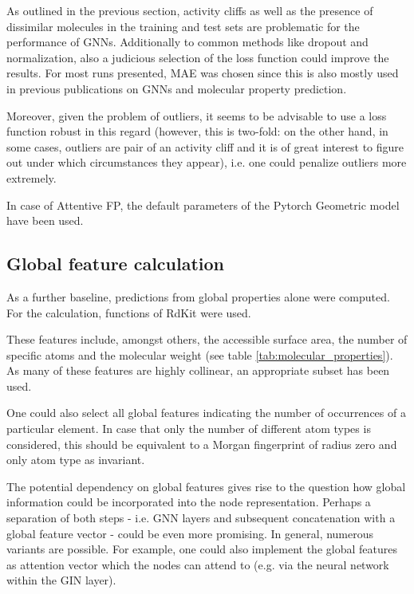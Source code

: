 As outlined in the previous section, activity cliffs as well as the presence of dissimilar molecules in the training and test sets are problematic for the performance of GNNs. Additionally to common methods like dropout and normalization, also a judicious selection of the loss function could improve the results.
For most runs presented, MAE was chosen since this is also mostly used in previous publications on GNNs and molecular property prediction.

Moreover, given the problem of outliers, it seems to be advisable to use a loss function robust in this regard (however, this is two-fold: on the other hand, in some cases, outliers are pair of an activity cliff and it is of great interest to figure out under which circumstances they appear), i.e. one could penalize outliers more extremely.

In case of Attentive FP, the default parameters of the Pytorch Geometric model have been used.




\subsection{Global feature calculation}

As a further baseline, predictions from global properties alone were computed. 
For the calculation, functions of RdKit were used.


These features include, amongst others, the accessible surface area, the number of specific atoms and the molecular weight (see table \ref{tab:molecular_properties}). As many of these features are highly collinear, an appropriate subset has been used.

One could also select all global features indicating the number of occurrences of a particular element. In case that only the number of different atom types is considered, this should be equivalent to a Morgan fingerprint of radius zero and only atom type as invariant.

The potential dependency on global features gives rise to the question how global information could be incorporated into the node representation. Perhaps a separation of both steps - i.e. GNN layers and subsequent concatenation with a global feature vector - could be even more promising. In general, numerous variants are possible. For example, one could also implement the global features as attention vector which the nodes can attend to (e.g. via the neural network within the GIN layer).




